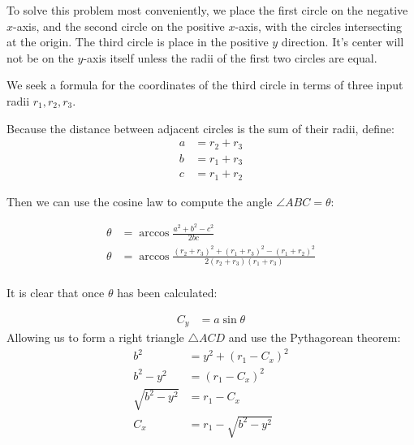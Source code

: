 \documentclass{article}
\begin{document}
To solve this problem most conveniently, we place the first circle on the negative $x$-axis, and the second circle
on the positive $x$-axis, with the circles intersecting at the origin.
The third circle is place in the positive $y$ direction. It's center will not be on the $y$-axis itself unless the
radii of the first two circles are equal.

We seek a formula for the coordinates of the third circle in terms of three input radii $r_1,r_2,r_3$.

Because the distance between adjacent circles is the sum of their radii, define:
\begin{align}
a  &= r_2 + r_3 \\
b  &= r_1 + r_3 \\
c  &= r_1 + r_2
\end{align}

Then we can use the cosine law to compute the angle $\angle ABC = \theta$:


\begin{align}
  \theta  &= \arccos{\frac{a^2 + b^2 - c^2}{2bc}} \\
  \theta  &= \arccos{\frac{(r_2+r_3)^2 + (r_1+r_3)^2 - (r_1+r_2)^2}{2(r_2+r_3)(r_1+r_3)}} \\
\end{align}

It is clear that once $\theta$ has been calculated:

\begin{align}
 C_y  &= a\sin{\theta}
\end{align}
Allowing us to form a right triangle $\triangle ACD$ and use the Pythagorean theorem:
\begin{align}
  b^2  &= y^2 + (r_1-C_x)^2 \\
  b^2 - y^2  &= (r_1-C_x)^2  \\
  \sqrt{b^2 - y^2}  &= r_1-C_x  \\
  C_x &= r_1 -  \sqrt{b^2 - y^2}
\end{align}
\end{document}
